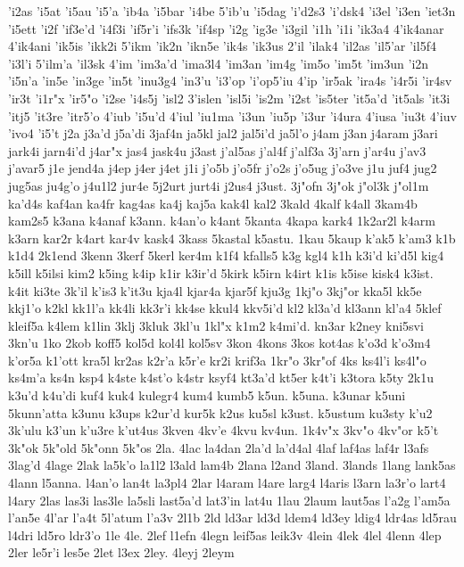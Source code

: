 {'i2as
'i5at
'i5au
'i5'a
'ib4a
'i5bar
'i4be
5'ib'u
'i5dag
'i'd2s3
'i'dsk4
'i3el
'i3en
'iet3n
'i5ett
'i2f
'if3e'd
'i4f3i
'if5r'i
'ifs3k
'if4sp
'i2g
'ig3e
'i3gil
'i1h
'i1i
'ik3a4
4'ik4anar
4'ik4ani
'ik5is
'ikk2i
5'ikm
'ik2n
'ikn5e
'ik4s
'ik3us
2'il
'ilak4
'il2as
'il5'ar
'il5f4
'i3l'i
5'ilm'a
'il3sk
4'im
'im3a'd
'ima3l4
'im3an
'im4g
'im5o
'im5t
'im3un
'i2n
'i5n'a
'in5e
'in3ge
'in5t
'inu3g4
'in3'u
'i3'op
'i'op5'iu
4'ip
'ir5ak
'ira4s
'i4r5i
'ir4sv
'ir3t
'i1r"x
'ir5"o
'i2se
'i4s5j
'isl2
3'islen
'isl5i
'is2m
'i2st
'is5ter
'it5a'd
'it5als
'it3i
'itj5
'it3re
'itr5'o
4'iub
'i5u'd
4'iul
'iu1ma
'i3un
'iu5p
'i3ur
'i4ura
4'iusa
'iu3t
4'iuv
'ivo4
'i5't
j2a
j3a'd
j5a'di
3jaf4n
ja5kl
jal2
jal5i'd
ja5l'o
j4am
j3an
j4aram
j3ari
jark4i
jarn4i'd
j4ar"x
jas4
jask4u
j3ast
j'al5as
j'al4f
j'alf3a
3j'arn
j'ar4u
j'av3
j'avar5
j1e
jend4a
j4ep
j4er
j4et
j1i
j'o5b
j'o5fr
j'o2s
j'o5ug
j'o3ve
j1u
juf4
jug2
jug5as
ju4g'o
j4u1l2
jur4e
5j2urt
jurt4i
j2us4
j3ust.
3j"ofn
3j"ok
j"ol3k
j"ol1m
ka'd4s
kaf4an
ka4fr
kag4as
ka4j
kaj5a
kak4l
kal2
3kald
4kalf
k4all
3kam4b
kam2s5
k3ana
k4anaf
k3ann.
k4an'o
k4ant
5kanta
4kapa
kark4
1k2ar2l
k4arm
k3arn
kar2r
k4art
kar4v
kask4
3kass
5kastal
k5astu.
1kau
5kaup
k'ak5
k'am3
k1b
k1d4
2k1end
3kenn
3kerf
5kerl
ker4m
k1f4
kfalls5
k3g
kgl4
k1h
k3i'd
ki'd5l
kig4
k5ill
k5ilsi
kim2
k5ing
k4ip
k1ir
k3ir'd
5kirk
k5irn
k4irt
k1is
k5ise
kisk4
k3ist.
k4it
ki3te
3k'il
k'is3
k'it3u
kja4l
kjar4a
kjar5f
kju3g
1kj"o
3kj"or
kka5l
kk5e
kkj1'o
k2kl
kk1l'a
kk4li
kk3r'i
kk4se
kkul4
kkv5i'd
kl2
kl3a'd
kl3ann
kl'a4
5klef
kleif5a
k4lem
k1lin
3klj
3kluk
3kl'u
1kl"x
k1m2
k4mi'd.
kn3ar
k2ney
kni5svi
3kn'u
1ko
2kob
koff5
kol5d
kol4l
kol5sv
3kon
4kons
3kos
kot4as
k'o3d
k'o3m4
k'or5a
k1'ott
kra5l
kr2as
k2r'a
k5r'e
kr2i
krif3a
1kr"o
3kr"of
4ks
ks4l'i
ks4l"o
ks4m'a
ks4n
ksp4
k4ste
k4st'o
k4str
ksyf4
kt3a'd
kt5er
k4t'i
k3tora
k5ty
2k1u
k3u'd
k4u'di
kuf4
kuk4
kulegr4
kum4
kumb5
k5un.
k5una.
k3unar
k5uni
5kunn'atta
k3unu
k3ups
k2ur'd
kur5k
k2us
ku5sl
k3ust.
k5ustum
ku3sty
k'u2
3k'ulu
k3'un
k'u3re
k'ut4us
3kven
4kv'e
4kvu
kv4un.
1k4v"x
3kv"o
4kv"or
k5't
3k"ok
5k"old
5k"onn
5k"os
2la.
4lac
la4dan
2la'd
la'd4al
4laf
laf4as
laf4r
l3afs
3lag'd
4lage
2lak
la5k'o
la1l2
l3ald
lam4b
2lana
l2and
3land.
3lands
1lang
lank5as
4lann
l5anna.
l4an'o
lan4t
la3pl4
2lar
l4aram
l4are
larg4
l4aris
l3arn
la3r'o
lart4
l4ary
2las
las3i
las3le
la5sli
last5a'd
lat3'in
lat4u
1lau
2laum
laut5as
l'a2g
l'am5a
l'an5e
4l'ar
l'a4t
5l'atum
l'a3v
2l1b
2ld
ld3ar
ld3d
ldem4
ld3ey
ldig4
ldr4as
ld5rau
l4dri
ld5ro
ldr3'o
1le
4le.
2lef
l1efn
4legn
leif5as
leik3v
4lein
4lek
4lel
4lenn
4lep
2ler
le5r'i
les5e
2let
l3ex
2ley.
4leyj
2leym
}
